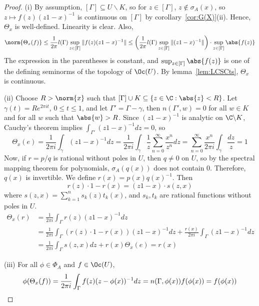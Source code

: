 \documentclass[a4paper]{article}
\begin{document}
\begin{proof}
	(i) By assumption, $[\Gamma]\subseteq U\backslash K$, so for $z\in[\Gamma]$, $z\notin\sigma_A(x)$, so $z\mapsto f(z)(z1-x)^{-1}$ is continuous on $[\Gamma]$ by corollary~\ref{cor:G(X)}(ii). Hence, $\Theta_x$ is well-defined. Linearity is clear. Also,
	\[
	 \norm{\Theta_x(f)}\leq\frac{1}{2\pi}l(\Gamma)\sup_{z\in[\Gamma]}\|f(z)(z1-x)^{-1}\|\leq\bigg(\frac{1}{2\pi}l(\Gamma)\sup_{z\in[\Gamma]}\|(z1-x)^{-1}\|\bigg)\cdot\sup_{z\in[\Gamma]}\abs{f(z)}
	\]
	The expression in the parentheses is constant, and $\sup_{z\in[\Gamma]}\abs{f(z)}$ is one of the defining seminorms of the topology of $\Oc(U)$. By lemma~\ref{lem:LCSCts}, $\Theta_x$ is continuous.

	(ii) Choose $R>\norm{x}$ such that $[\Gamma]\cup K\subseteq\{z\in\C:\abs{z}<R\}$. Let $\gamma(t)=Re^{2\pi it}$, $0\leq t\leq 1$, and let $\Gamma'=\Gamma-\gamma$, then $n(\Gamma',w)=0$ for all $w\in K$ and for all $w$ such that $\abs{w}>R$. Since $(z1-x)^{-1}$ is analytic on $\C\backslash K$, Cauchy's theorem implies $\int_{\Gamma'}(z1-x)^{-1}dz=0$, so
	\[
	 \Theta_x(e)=\frac{1}{2\pi i}\int_{\gamma}(z1-x)^{-1}dz=\frac{1}{2\pi i}\int_\gamma\frac{1}{z}\sum_{n=0}^\infty\frac{x^n}{z^n}dz=\sum_{n=0}^\infty\frac{x^n}{2\pi i}\int_\gamma\frac{dz}{z}=1
	\]
	Now, if $r=p/q$ is rational without poles in $U$, then $q\not= 0$ on $U$, so by the spectral mapping theorem for polynomials, $\sigma_A(q(x))$ does not contain 0. Therefore, $q(x)$ is invertible. We define $r(x)=p(x)q(x)^{-1}$. Then
	\[
	 r(z)\cdot 1-r(x)=(z1-x)\cdot s(z,x)
	\]
	where $s(z,x)=\sum_{k=1}^n s_k(z)t_k(x)$, and $s_k,t_k$ are rational functions without poles in $U$.
	\begin{align*}
		\Theta_x(r)&=\frac{1}{2\pi i}\int_\Gamma r(z)(z1-x)^{-1}dz\\
		&=\frac{1}{2\pi i}\int_\Gamma (r(z)\cdot 1-r(x))(z1-x)^{-1}dz+\frac{r(x)}{2\pi i}\int_\Gamma (z1-x)^{-1}dz\\
		&=\frac{1}{2\pi i}\int_\Gamma s(z,x)dz+r(x)\Theta_x(e)=r(x)
	\end{align*}

	(iii) For all $\phi\in\Phi_A$ and $f\in\Oc(U)$,
	\[
	 \phi(\Theta_x(f))=\frac{1}{2\pi i}\int_\Gamma f(z)(z-\phi(x))^{-1}dz=n(\Gamma,\phi(x))f(\phi(x))=f(\phi(x))\qedhere
	\]
\end{proof}
\end{document}
